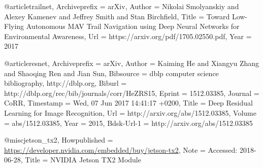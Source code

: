 
@article{trailnet,
	Archiveprefix = {arXiv},
	Author = {Nikolai Smolyanskiy and Alexey Kamenev and Jeffrey Smith and Stan Birchfield},
	Title = {Toward Low-Flying Autonomous MAV Trail Navigation using Deep Neural Networks for Environmental Awareness},
	Url = {https://arxiv.org/pdf/1705.02550.pdf},
	Year = {2017}
	}

@article{resnet,
	Archiveprefix = {arXiv},
	Author = {Kaiming He and Xiangyu Zhang and Shaoqing Ren and Jian Sun},
	Bibsource = {dblp computer science bibliography, http://dblp.org},
	Biburl = {http://dblp.org/rec/bib/journals/corr/HeZRS15},
	Eprint = {1512.03385},
	Journal = {CoRR},
	Timestamp = {Wed, 07 Jun 2017 14:41:17 +0200},
	Title = {Deep Residual Learning for Image Recognition},
	Url = {http://arxiv.org/abs/1512.03385},
	Volume = {abs/1512.03385},
	Year = {2015},
	Bdsk-Url-1 = {http://arxiv.org/abs/1512.03385}}

@misc{jetson_tx2,
	Howpublished = {\url{https://developer.nvidia.com/embedded/buy/jetson-tx2}},
	Note = {{A}ccessed: 2018-06-28},
	Title = {NVIDIA Jetson TX2 Module}}

